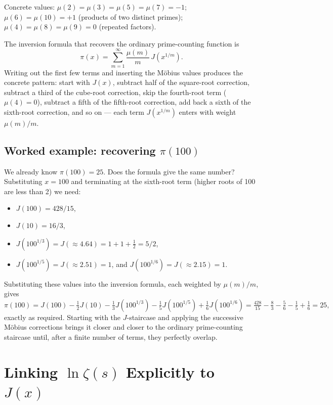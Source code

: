 \documentclass[11pt]{article}
\begin{document}
Concrete values: $\mu(2) = \mu(3) = \mu(5) = \mu(7) = -1$; $\mu(6) = \mu(10) = +1$ (products of two distinct primes); $\mu(4) = \mu(8) = \mu(9) = 0$ (repeated factors).

The inversion formula that recovers the ordinary prime-counting function is
\[
\pi(x) = \sum_{m=1}^{\infty} \frac{\mu(m)}{m}\, J\!\left(x^{1/m}\right).
\]
Writing out the first few terms and inserting the M\"obius values produces the concrete pattern: start with $J(x)$, subtract half of the square-root correction, subtract a third of the cube-root correction, skip the fourth-root term ($\mu(4) = 0$), subtract a fifth of the fifth-root correction, add back a sixth of the sixth-root correction, and so on --- each term $J(x^{1/m})$ enters with weight $\mu(m)/m$.

\subsection*{Worked example: recovering $\pi(100)$}

We already know $\pi(100) = 25$. Does the formula give the same number? Substituting $x = 100$ and terminating at the sixth-root term (higher roots of 100 are less than 2) we need:
\begin{itemize}[nosep]
\item $J(100) = 428/15$,
\item $J(10) = 16/3$,
\item $J(100^{1/3}) = J({\approx}4.64) = 1 + 1 + \tfrac{1}{2} = 5/2$,
\item $J(100^{1/5}) = J({\approx}2.51) = 1$, and $J(100^{1/6}) = J({\approx}2.15) = 1$.
\end{itemize}

Substituting these values into the inversion formula, each weighted by $\mu(m)/m$, gives
\[
\pi(100) = J(100) - \tfrac{1}{2}J(10) - \tfrac{1}{3}J(100^{1/3}) - \tfrac{1}{5}J(100^{1/5}) + \tfrac{1}{6}J(100^{1/6}) = \tfrac{428}{15} - \tfrac{8}{3} - \tfrac{5}{6} - \tfrac{1}{5} + \tfrac{1}{6} = 25,
\]
exactly as required. Starting with the $J$-staircase and applying the successive M\"obius corrections brings it closer and closer to the ordinary prime-counting staircase until, after a finite number of terms, they perfectly overlap.

\section{Linking $\ln \zeta(s)$ Explicitly to $J(x)$}
\end{document}
